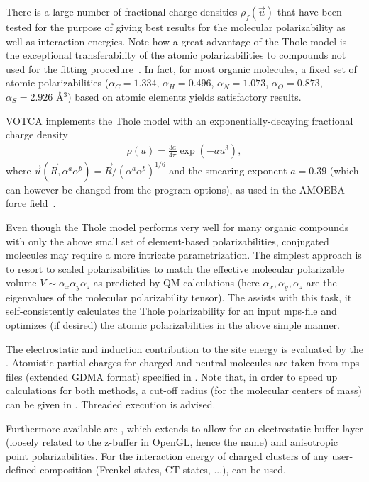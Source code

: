 There is a large number of fractional charge densities $\rho_f(\vec{u})$ that have been tested for the purpose of giving best results for the molecular polarizability as well as interaction energies. Note how a great advantage of the Thole model is the exceptional transferability of the atomic polarizabilities to compounds not used for the fitting procedure~\cite{van_duijnen_molecular_1998}. In fact, for most organic molecules, a fixed set of atomic polarizabilities ($\alpha_C = 1.334$, $\alpha_H = 0.496$, $\alpha_N = 1.073$, $\alpha_O = 0.873$, $\alpha_S = 2.926$ \AA$^3$) based on atomic elements yields satisfactory results.

VOTCA implements the Thole model with an exponentially-decaying fractional charge density
\begin{align}
 \rho(u) = \frac{3a}{4\pi} \exp(-au^3),
\end{align}
where $\vec{u}(\vec{R},\alpha^a \alpha^b) = \vec{R} / (\alpha^a \alpha^b)^{1/6}$ and the smearing exponent $a=0.39$ (which can however be changed from the program options), as used in the AMOEBA force field~\cite{ren_polarizable_2003}.

Even though the Thole model performs very well for many organic compounds with only the above small set of element-based polarizabilities, conjugated molecules may require a more intricate parametrization. The simplest approach is to resort to scaled polarizabilities to match the effective molecular polarizable volume $V \sim \alpha_{x} \alpha_{y} \alpha_{z}$ as predicted by QM calculations (here $\alpha_x, \alpha_y, \alpha_z$ are the eigenvalues of the molecular polarizability tensor). The  \tool assists with this task, it self-consistently calculates the Thole polarizability for an input mps-file and optimizes (if desired) the atomic polarizabilities in the above simple manner.


The electrostatic and induction contribution to the site energy is evaluated by the  \calculator. Atomistic partial charges for charged and neutral molecules are taken from mps-files (extended GDMA format) specified in \xmlcsg. Note that, in order to speed up calculations for both methods, a cut-off radius (for the molecular centers of mass) can be given in \xmloptions. Threaded execution is advised.


Furthermore available are , which extends  to allow for an electrostatic buffer layer (loosely related to the z-buffer in OpenGL, hence the name) and anisotropic point polarizabilities. For the interaction energy of charged clusters of any user-defined composition (Frenkel states, CT states, ...),  can be used.

